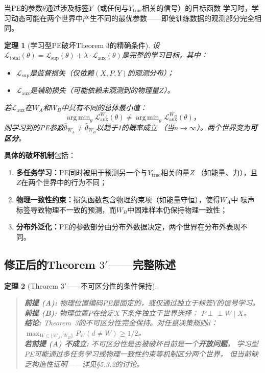\documentclass[11pt,a4paper]{article}
\newtheorem{theorem}{定理}[section]
\theoremstyle{remark}
\DeclareMathOperator*{\argmin}{arg\,min}
\newcommand{\indep}{\perp\!\!\!\perp}
\begin{document}
当PE的参数$\theta$通过涉及标签$Y$（或任何与$Y_{\text{true}}$相关的信号）的目标函数
学习时，学习动态可能在两个世界中产生不同的最优参数——即使训练数据的观测部分完全相同。

\begin{theorem}[学习型PE破坏Theorem 3的精确条件]
\label{thm:4.1}
设$\mathcal{L}_{\text{total}}(\theta) = \mathcal{L}_{\text{sup}}(\theta)
+ \lambda \cdot \mathcal{L}_{\text{aux}}(\theta)$是完整的学习目标，其中：
\begin{itemize}
    \item $\mathcal{L}_{\text{sup}}$是监督损失（仅依赖$(X, P, Y)$的观测分布）；
    \item $\mathcal{L}_{\text{aux}}$是辅助损失（可能依赖未观测到的物理量$Z$）。
\end{itemize}
若$\mathcal{L}_{\text{aux}}$在$W_A$和$W_B$中具有不同的总体最小值：
\begin{equation}
    \argmin_\theta \mathcal{L}_{\text{aux}}^{W_A}(\theta)
    \neq \argmin_\theta \mathcal{L}_{\text{aux}}^{W_B}(\theta)，
\end{equation}
则学习到的PE参数$\hat{\theta}_{W_A} \neq \hat{\theta}_{W_B}$以趋于1的概率成立
（当$n \to \infty$）。两个世界变为\textbf{可区分}。
\end{theorem}

\textbf{具体的破坏机制}包括：
\begin{enumerate}[label=(\roman*)]
    \item \textbf{多任务学习：}PE同时被用于预测另一个与$Y_{\text{true}}$相关的量$Z$
          （如能量、力），且$Z$在两个世界中的行为不同；
    \item \textbf{物理一致性约束：}损失函数包含物理约束项（如能量守恒），使得$W_A$中
          噪声标签导致物理不一致的预测，而$W_B$中困难样本仍保持物理一致性；
    \item \textbf{分布外泛化：}PE的参数部分由分布外数据决定，两个世界在分布外表现不同。
\end{enumerate}

\subsection{修正后的Theorem $3'$——完整陈述}

\begin{theorem}[Theorem $3'$——不可区分性的条件保持]
\label{thm:3'}
\begin{quote}
\textbf{前提 (A):} 物理位置编码PE是固定的，或仅通过独立于标签$Y$的信号学习。\\
\textbf{前提 (B):} 物理位置$P$在给定$X$下条件独立于世界选择：
$P \indep W \mid X$。\\
\textbf{结论:} Theorem~3的不可区分性完全保持。对任意决策规则$d$：
$\max_{W \in \{W_A, W_B\}} P_W(d \neq W) \geq 1/2$。\\
\textbf{若前提 (A) 不成立:} 不可区分性是否被破坏目前是一个\textbf{开放问题}。
学习型PE可能通过多任务学习或物理一致性约束等机制区分两个世界，
但当前缺乏构造性证明——详见\S5.3.2的讨论。
\end{quote}
\end{theorem}
\end{document}
